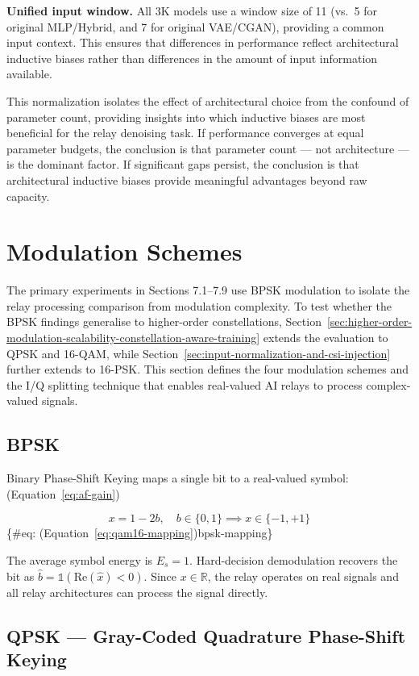 \textbf{Unified input window.} All 3K models use a window size of 11 (vs.~5 for original MLP/Hybrid, and 7 for original VAE/CGAN), providing a common input context. This ensures that differences in performance reflect architectural inductive biases rather than differences in the amount of input information available.

This normalization isolates the effect of architectural choice from the confound of parameter count, providing insights into which inductive biases are most beneficial for the relay denoising task. If performance converges at equal parameter budgets, the conclusion is that parameter count --- not architecture --- is the dominant factor. If significant gaps persist, the conclusion is that architectural inductive biases provide meaningful advantages beyond raw capacity.

\section{Modulation Schemes}\label{sec:modulation-schemes}

The primary experiments in Sections 7.1--7.9 use BPSK modulation to isolate the relay processing comparison from modulation complexity. To test whether the BPSK findings generalise to higher-order constellations, Section~\ref{sec:higher-order-modulation-scalability-constellation-aware-training} extends the evaluation to QPSK and 16-QAM, while Section~\ref{sec:input-normalization-and-csi-injection} further extends to 16-PSK. This section defines the four modulation schemes and the I/Q splitting technique that enables real-valued AI relays to process complex-valued signals.

\subsection{BPSK}\label{sec:bpsk}

Binary Phase-Shift Keying maps a single bit to a real-valued symbol: (Equation~\ref{eq:af-gain})

\[x = 1 - 2b, \quad b \in \{0, 1\} \implies x \in \{-1, +1\}
\] \{\#eq: (Equation~\ref{eq:qam16-mapping})bpsk-mapping\}

The average symbol energy is \(E_s = 1\). Hard-decision demodulation recovers the bit as \(\hat{b} = \mathbb{1}(\text{Re}(\hat{x}) < 0)\). Since \(x \in \mathbb{R}\), the relay operates on real signals and all relay architectures can process the signal directly.

\subsection{QPSK --- Gray-Coded Quadrature Phase-Shift Keying}\label{sec:qpsk-gray-coded-quadrature-phase-shift-keying}

